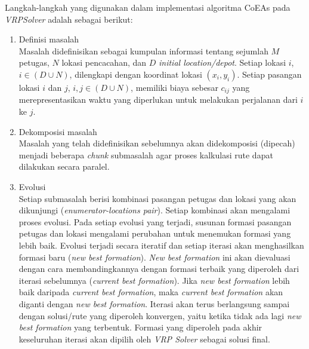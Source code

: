 Langkah-langkah yang digunakan dalam implementasi algoritma CoEAs pada \textit{VRPSolver} adalah sebagai berikut:
\begin{enumerate}
\item Definisi masalah \\
Masalah didefinisikan sebagai kumpulan informasi tentang sejumlah $M$ petugas, $N$ lokasi pencacahan, dan $D$ \textit{initial location/depot}. Setiap lokasi $i$, $i \in (D \cup N)$, dilengkapi dengan koordinat lokasi $(x_i, y_i)$. Setiap pasangan lokasi $i$ dan $j$, $i, j \in (D \cup N)$, memiliki biaya sebesar $c_{ij}$ yang merepresentasikan waktu yang diperlukan untuk melakukan perjalanan dari $i$ ke $j$. 

\item Dekomposisi masalah \\
Masalah yang telah didefinisikan sebelumnya akan didekomposisi (dipecah) menjadi beberapa \textit{chunk} submasalah agar proses kalkulasi rute dapat dilakukan secara paralel. 

\item Evolusi \\
Setiap submasalah berisi kombinasi pasangan petugas dan lokasi yang akan dikunjungi (\textit{enumerator-locations pair}). Setiap kombinasi akan mengalami proses evolusi. Pada setiap evolusi yang terjadi, susunan formasi pasangan petugas dan lokasi mengalami perubahan untuk menemukan formasi yang lebih baik. Evolusi terjadi secara iteratif dan setiap iterasi akan menghasilkan formasi baru (\textit{new best formation}). \textit{New best formation} ini akan dievaluasi dengan cara membandingkannya dengan formasi terbaik yang diperoleh dari iterasi sebelumnya (\textit{current best formation}). Jika \textit{new best formation} lebih baik daripada \textit{current best formation}, maka \textit{current best formation} akan diganti dengan \textit{new best formation}. Iterasi akan terus berlangsung sampai dengan solusi/rute yang diperoleh konvergen, yaitu ketika tidak ada lagi \textit{new best formation} yang terbentuk. Formasi yang diperoleh pada akhir keseluruhan iterasi akan dipilih oleh \textit{VRP Solver} sebagai solusi final. 
\end{enumerate}


